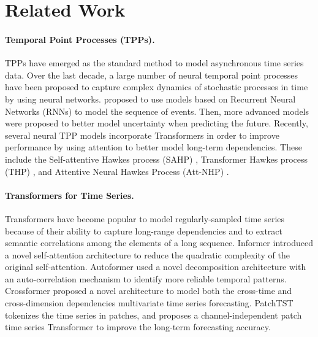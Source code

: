 \section{Related Work}

\paragraph{Temporal Point Processes (TPPs).} 
TPPs \citep{Hawkes1971Spectra, daley2007introduction} have emerged as the standard method to model asynchronous time series data. 
Over the last decade, a large number of neural temporal point processes have been proposed to capture complex dynamics of stochastic processes in time by using neural networks.
\citet{duTPP, MeiEisner} proposed to use models based on Recurrent Neural Networks (RNNs) to model the sequence of events. Then, more advanced models \citep{Mehrasa2019Variational, DiffusionTPP} were proposed to better model uncertainty when predicting the future. Recently, several neural TPP models incorporate Transformers in order to improve performance by using attention to better model long-term dependencies. These include the Self-attentive Hawkes process (SAHP) \citep{Zhang2020Self}, Transformer Hawkes process (THP) \citep{Zuo2020Transformer}, and Attentive Neural Hawkes Process (Att-NHP) \citep{Mei2022Transformer}.


\paragraph{Transformers for Time Series.} 
Transformers \citep{Vaswani2017Attention} have become popular to model regularly-sampled time series because of their ability to capture long-range dependencies and to extract semantic correlations among the elements of a long sequence. Informer \citep{Zhou2021Informer} introduced a novel self-attention architecture to reduce the quadratic complexity of the original self-attention. Autoformer \citep{Wu2021Autoformer} used a novel decomposition architecture with an auto-correlation mechanism to identify more reliable temporal patterns.  Crossformer \citep{Zhang2023Crossformer} proposed a novel architecture to model both  the cross-time and cross-dimension dependencies multivariate time series forecasting. PatchTST \citep{Yuqi2023PatchTST} tokenizes the time series in patches, and proposes a channel-independent patch time series Transformer to improve the long-term forecasting accuracy.


